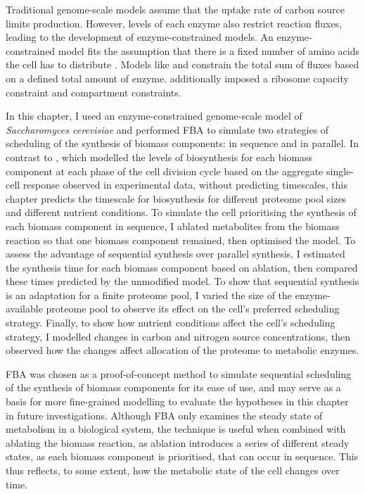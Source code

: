 Traditional genome-scale models assume that the uptake rate of carbon source limits production.
However, levels of each enzyme also restrict reaction fluxes, leading to the development of enzyme-constrained models.
An enzyme-constrained model fits the assumption that there is a fixed number of amino acids the cell has to distribute \parencite{weisseMechanisticLinksCellular2015}.
Models like \textcite{sanchezImprovingPhenotypePredictions2017} and \textcite{elsemmanWholecellModelingYeast2022} constrain the total sum of fluxes based on a defined total amount of enzyme.
\textcite{elsemmanWholecellModelingYeast2022} additionally imposed a ribosome capacity constraint and compartment constraints.

In this chapter, I used an enzyme-constrained genome-scale model of \textit{Saccharomyces cerevisiae} and performed FBA to simulate two strategies of scheduling of the synthesis of biomass components: in sequence and in parallel.
In contrast to \textcite{takhaveevTemporalSegregationBiosynthetic2023}, which modelled the levels of biosynthesis for each biomass component at each phase of the cell division cycle based on the aggregate single-cell response observed in experimental data, without predicting timescales, this chapter predicts the timescale for biosynthesis for different proteome pool sizes and different nutrient conditions.
To simulate the cell prioritising the synthesis of each biomass component in sequence, I ablated metabolites from the biomass reaction so that one biomass component remained, then optimised the model.
To assess the advantage of sequential synthesis over parallel synthesis, I estimated the synthesis time for each biomass component based on ablation, then compared these times predicted by the unmodified model.
To show that sequential synthesis is an adaptation for a finite proteome pool, I varied the size of the enzyme-available proteome pool to observe its effect on the cell's preferred scheduling strategy.
Finally, to show how nutrient conditions affect the cell's scheduling strategy, I modelled changes in carbon and nitrogen source concentrations, then observed how the changes affect allocation of the proteome to metabolic enzymes.

FBA was chosen as a proof-of-concept method to simulate sequential scheduling of the synthesis of biomass components for its ease of use, and may serve as a basis for more fine-grained modelling to evaluate the hypotheses in this chapter in future investigations.
Although FBA only examines the steady state of metabolism in a biological system, the technique is useful when combined with ablating the biomass reaction, as ablation introduces a series of different steady states, as each biomass component is prioritised, that can occur in sequence.
This thus reflects, to some extent, how the metabolic state of the cell changes over time.

